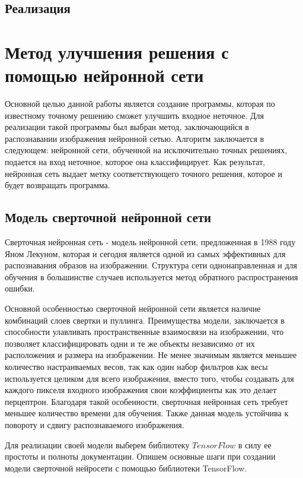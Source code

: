 \documentclass[12pt, a4paper]{article}
\begin{document}
\subsection{Реализация}



\section{Метод улучшения решения с помощью нейронной сети}

Основной целью данной работы является создание программы, которая по известному точному решению сможет улучшить входное неточное. Для реализации такой программы был выбран метод, заключающийся в распознавании изображения нейронной сетью. Алгоритм заключается в следующем: нейронной сети, обученной на исключительно точных решениях, подается на вход неточное, которое она классифицирует. Как результат, нейронная сеть выдает метку соответствующего точного решения, которое и будет возвращать программа.

\subsection{Модель сверточной нейронной сети}

Сверточная нейронная сеть \cite{1} - модель нейронной сети, предложенная в 1988 году Яном Лекуном, которая и сегодня является одной из самых эффективных для распознавания образов на изображении. Структура сети однонаправленная и для обучения в большинстве случаев используется метод обратного распространения ошибки.

Основной особенностью сверточной нейронной сети является наличие комбинаций слоев свертки и пуллинга. Преимущества модели, заключается в способности улавливать пространственные взаимосвязи на изображении, что позволяет классифицировать одни и те же объекты независимо от их расположения и размера на изображении. Не менее значимым является меньшее количество настраиваемых весов, так как один набор фильтров как весы используется целиком для всего изображения, вместо того, чтобы создавать для каждого пикселя входного изображения свои коэффициенты как это делает перцептрон. Благодаря такой особенности, сверточная нейронная сеть требует меньшее количество времени для обучения. Также данная модель устойчива к повороту и сдвигу распознаваемого изображения. 

Для реализации своей модели выберем библиотеку $TensorFlow$ в силу ее простоты и полноты документации. Опишем основные шаги при создании модели сверточной нейросети с помощью библиотеки TensorFlow. 
\end{document}
